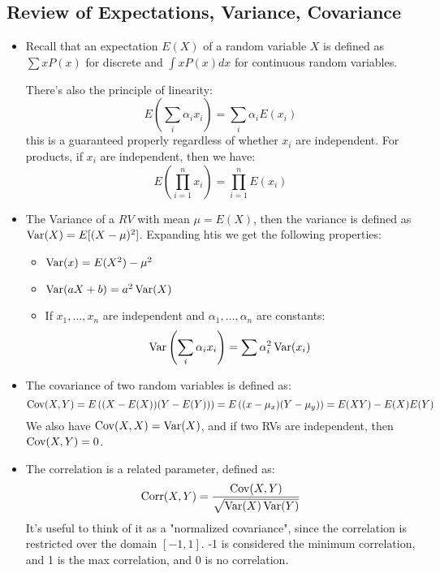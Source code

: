 \subsection{Review of Expectations, Variance, Covariance}
\begin{itemize}
	\item Recall that an expectation \( E(X) \) of a random variable \( X \) is
		defined as \( \sum x P(x) \) for discrete and \( \int x P(x) dx \) for
		continuous random variables.  

		There's also the principle of linearity: 
		\[
			E\left(\sum_i \alpha_i x_i\right) = \sum_i \alpha_i E(x_i)
		\]
		this is a guaranteed properly regardless of whether \( x_i \) are
		independent. For products, if \( x_i \) are independent, then we have:
		\[
			E \left( \prod_{i = 1}^{n}x_i \right) = \prod_{i = 1}^{n}E(x_i)
		\]
	\item The Variance of a \( RV \) with mean \( \mu = E(X) \), then the variance is
		defined as \( \operatorname*{Var}(X) = E[(X - \mu)^2] \). Expanding htis we get the
		following properties:
		\begin{itemize}
			\item \( \operatorname*{Var}(x) = E(X^2) - \mu^2 \)
			\item \( \operatorname*{Var}(aX + b) = a^2 \operatorname*{Var}(X) \)
			\item If \( x_1, \dots, x_n \) are independent and \( \alpha_1, \dots,
				\alpha_n \) are constants:
				\[
					\operatorname*{Var}\left( \sum_i \alpha_i x_i \right) = \sum \alpha_i^2
					\operatorname*{Var}(x_i)
				\]
		\end{itemize}
	\item The covariance of two random variables is defined as:
		\[
			\operatorname*{Cov}(X, Y) = E\left( (X - E(X)) (Y - E(Y)) \right) = 
			E\left((x - \mu_x)(Y - \mu_y)\right) = E(XY) - E(X)E(Y)
		\]
		We also have \( \operatorname*{Cov}(X, X) = \operatorname*{Var}(X) \), and if two RVs are independent, then
		\( \operatorname*{Cov}(X, Y) = 0 \). 
	\item The correlation is a related parameter, defined as:
		\[
			\operatorname*{Corr}(X, Y) = \frac{\operatorname*{Cov}(X, Y)}{\sqrt{\operatorname*{Var}(X) \operatorname*{Var}(Y)}}
		\]
		It's useful to think of it as a "normalized covariance", since the
		correlation is restricted over the domain \( [-1, 1] \). -1 is considered the
		minimum correlation, and 1 is the max correlation, and 0 is no correlation. 
\end{itemize}
